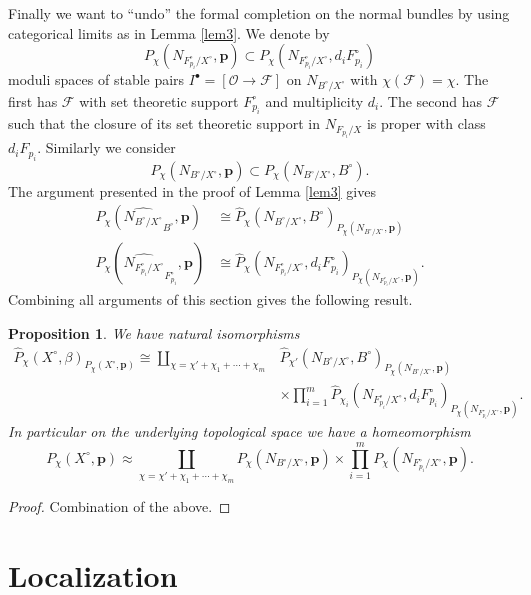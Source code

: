 \documentclass[12pt]{amsart}
\newtheorem{proposition}[theorem]{Proposition}
\theoremstyle{definition}
\theoremstyle{property}
\renewcommand\O{\mathcal O}
\newcommand\mdot{{\scriptscriptstyle\bullet}}
\newcommand\F{\mathcal F}
\newcommand\p{\mathbf{p}}
\renewcommand\_{^{}_}
\begin{document}
Finally we want to ``undo'' the formal completion on the normal bundles by using categorical limits as in Lemma \ref{lem3}. We denote by 
$$
P_{\chi}(N_{F_{p_i}^{\circ} / X^{\circ}}, \p) \subset P_{\chi}(N_{F_{p_i}^\circ / X^\circ}, d_i F_{p_i}^{\circ})
$$
moduli spaces of stable pairs $I^\mdot = [\O \rightarrow \F]$ on $N_{B^\circ / X^\circ}$ with $\chi(\F) = \chi$. The first has $\F$ with set theoretic support $F_{p_i}^{\circ}$ and multiplicity $d_i$. The second has $\F$ such that the closure of its set theoretic support in $N_{F_{p_i} / X}$ is proper with class $d_i F_{p_i}$. Similarly we consider 
$$
P_{\chi}(N_{B^{\circ} / X^{\circ}}, \p) \subset P_{\chi}(N_{B^\circ / X^\circ}, B^\circ).
$$
The argument presented in the proof of Lemma \ref{lem3} gives
\begin{align*}
P_{\chi}(\widehat{N_{B^{\circ} / X^\circ}}_{B^\circ}, \p) &\cong \widehat{P}_{\chi}(N_{B^\circ / X^\circ}, B^\circ)_{P_{\chi}(N_{B^{\circ} / X^\circ}, \p)}  \\
P_{\chi}(\widehat{N_{F_{p_i}^{\circ} / X^\circ}}_{F_{p_i}^{\circ}}, \p) &\cong \widehat{P}_{\chi}(N_{F_{p_i}^{\circ} / X^\circ}, d_i F_{p_i}^{\circ})_{P_{\chi}(N_{F_{p_i}^{\circ} / X^\circ}, \p)}.
\end{align*}
Combining all arguments of this section gives the following result.
\begin{proposition}
We have natural isomorphisms
\begin{align*}
\widehat{P}_{\chi}(X^\circ,\beta)_{P_{\chi}(X^\circ,\p)} \cong \coprod_{\chi = \chi' + \chi_1 + \cdots + \chi_m} &\widehat{P}_{\chi'}(N_{B^\circ / X^\circ}, B^\circ)_{P_{\chi}(N_{B^{\circ} / X^\circ}, \p)} \\
&\times \prod_{i=1}^{m} \widehat{P}_{\chi_i}(N_{F_{p_i}^{\circ} / X^\circ}, d_i F_{p_i}^{\circ})_{P_{\chi}(N_{F_{p_i}^{\circ} / X^\circ}, \p)}.
\end{align*}
In particular on the underlying topological space we have a homeomorphism
\[
P_{\chi}(X^\circ,\p) \approx \coprod_{\chi = \chi' + \chi_1 + \cdots + \chi_m} P_{\chi}(N_{B^{\circ} / X^\circ}, \p) \times \prod_{i=1}^{m} P_{\chi}(N_{F_{p_i}^{\circ} / X^\circ}, \p).
\]
\end{proposition}
\begin{proof}
Combination of the above.
\end{proof}


\section{Localization}
\end{document}
